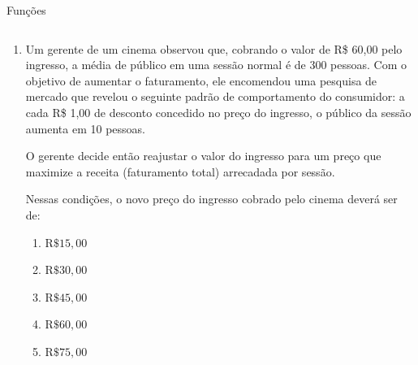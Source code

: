 \documentclass[aspectratio=169, t, 8pt]{beamer}
\newcounter{questaovest}
\newcommand{\vest}{\stepcounter{questaovest}\item[\textbf{Questão \arabic{questaovest}}:]}
\begin{document}
    \begin{frame}{Funções}
        \begin{columns}[totalwidth=.9\textwidth]
            \begin{column}{\textwidth}
                \begin{enumerate}
                    \vest Um gerente de um cinema observou que, cobrando o valor de R\$ 60,00 pelo ingresso, a média de público em uma sessão normal é de 300 pessoas. Com o objetivo de aumentar o faturamento, ele encomendou uma pesquisa de mercado que revelou o seguinte padrão de comportamento do consumidor: a cada R\$ 1,00 de desconto concedido no preço do ingresso, o público da sessão aumenta em 10 pessoas.

                    \vspace{1em}

                    O gerente decide então reajustar o valor do ingresso para um preço que maximize a receita (faturamento total) arrecadada por sessão.

                    \vspace{1em}

                    Nessas condições, o novo preço do ingresso cobrado pelo cinema deverá ser de:

                    \vspace{.8em}

                    \begin{enumerate}
                        \item $\text{R\$ } 15,00$
                        \item $\text{R\$ } 30,00$
                        \item $\text{R\$ } 45,00$
                        \item $\text{R\$ } 60,00$
                        \item $\text{R\$ } 75,00$
                    \end{enumerate}
                \end{enumerate}
            \end{column}
        \end{columns}
    \end{frame}
\end{document}
